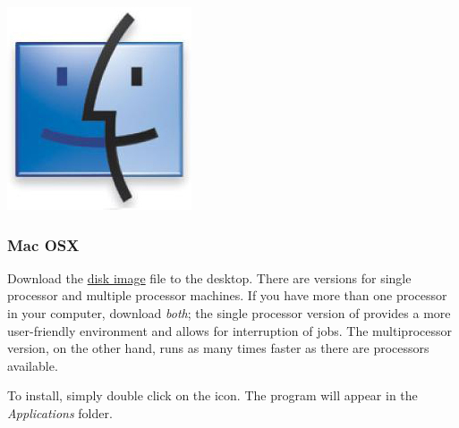 \begin{flushleft}
	\begin{minipage}[c]{0.074\textwidth}
   		\includegraphics[width=\textwidth]{figures/figLogoMac.jpg}
	\end{minipage}
	\quad
	\begin{minipage}[t]{0.88\textwidth}
	   	\subsubsection{Mac OSX}
	\end{minipage}
            Download the
            \href{http://research.amnh.org/scicomp/projects/poy.php}{disk
            image} file to the desktop. There are versions for single
            processor and multiple processor machines. If you have more than
            one processor in your computer, download \emph{both}; the
            single processor version of \poy provides a more user-friendly
            environment and allows for interruption of jobs. The
            multiprocessor version, on the other hand, runs as many times faster as
            there are processors available.

            To install, simply double click on the icon. The program will appear
            in the \emph{Applications} folder.


\end{flushleft}
